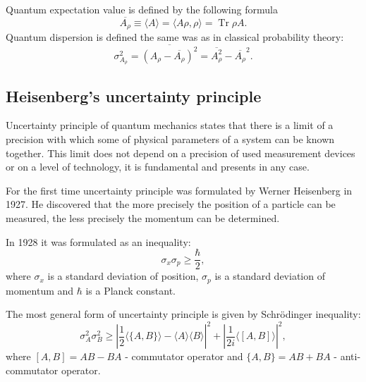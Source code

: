 \documentclass[11pt]{article}
\DeclareMathOperator{\Tr}{Tr}
\begin{document}
Quantum expectation value is defined by the following formula
\[
\overline{A_\rho} \equiv \langle A\rangle = \langle A\rho, \rho\rangle = \Tr\rho A.
\]
Quantum dispersion is defined the same was as in classical probability theory:
\[
\sigma^2_{A_\rho} = \overline{\left(A_\rho - \overline{A_\rho}\right)^2} = \overline{A^2_\rho} - \overline{A_\rho}^2.
\] 

\subsection{Heisenberg's uncertainty principle}
Uncertainty principle of quantum mechanics states that there is a limit of a precision with which some of physical parameters of a system can be known together. This limit does not depend on a precision of used measurement devices or on a level of technology, it is fundamental and presents in any case.

For the first time uncertainty principle was formulated by Werner Heisenberg in 1927. He discovered that the more precisely the position of a particle can be measured, the less precisely the momentum can be determined.

In 1928 it was formulated as an inequality:
\[
\sigma_x\sigma_p \geq \frac{\hbar}{2},
\]
where $\sigma_x$ is a standard deviation of position, $\sigma_p$ is a standard deviation of momentum and $\hbar$ is a Planck constant.

The most general form of uncertainty principle is given by Schr\"{o}dinger inequality:
\begin{equation}
\sigma_A^2\sigma_B^2 \geq \left| \frac{1}{2}\langle\{A, B\}\rangle - \langle A\rangle\langle B\rangle \right|^2 + \left| \frac{1}{2i}\langle [A, B]\rangle\right|^2,
\label{eq:Schrodinger_ineq}
\end{equation}
where $[A, B] = AB - BA$ - commutator operator and $\{A, B\} = AB + BA$ - anti-commutator operator.
\end{document}

